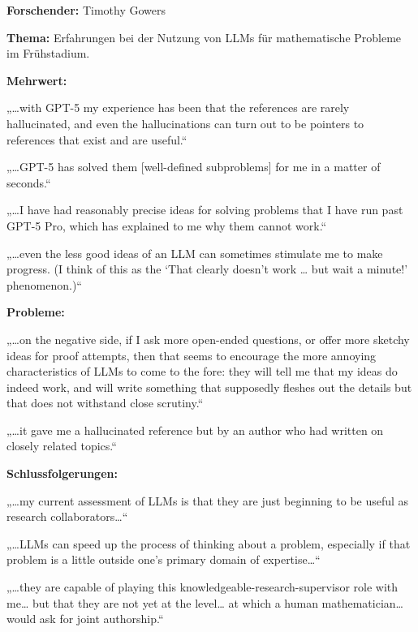 \documentclass[
  ngerman,
  letterpaper,
  DIV=11]{scrreprt}
\begin{document}
\begin{tcolorbox}[enhanced jigsaw, left=2mm, bottomrule=.15mm, arc=.35mm, rightrule=.15mm, colframe=quarto-callout-note-color-frame, coltitle=black, colback=white, toprule=.15mm, toptitle=1mm, colbacktitle=quarto-callout-note-color!10!white, title=\textcolor{quarto-callout-note-color}{\faInfo}\hspace{0.5em}{Mathematik / LLMs als Forschungspartner}, opacitybacktitle=0.6, leftrule=.75mm, bottomtitle=1mm, titlerule=0mm, opacityback=0, breakable]

\textbf{Forschender:} Timothy Gowers

\textbf{Thema:} Erfahrungen bei der Nutzung von LLMs für mathematische
Probleme im Frühstadium.

\textbf{Mehrwert:}

„\ldots with GPT-5 my experience has been that the references are rarely
hallucinated, and even the hallucinations can turn out to be pointers to
references that exist and are useful.``

„\ldots GPT-5 has solved them {[}well-defined subproblems{]} for me in a
matter of seconds.``

„\ldots I have had reasonably precise ideas for solving problems that I
have run past GPT-5 Pro, which has explained to me why them cannot
work.``

„\ldots even the less good ideas of an LLM can sometimes stimulate me to
make progress. (I think of this as the `That clearly doesn't work
\ldots{} but wait a minute!' phenomenon.)``

\textbf{Probleme:}

„\ldots on the negative side, if I ask more open-ended questions, or
offer more sketchy ideas for proof attempts, then that seems to
encourage the more annoying characteristics of LLMs to come to the fore:
they will tell me that my ideas do indeed work, and will write something
that supposedly fleshes out the details but that does not withstand
close scrutiny.``

„\ldots it gave me a hallucinated reference but by an author who had
written on closely related topics.``

\textbf{Schlussfolgerungen:}

„\ldots my current assessment of LLMs is that they are just beginning to
be useful as research collaborators\ldots``

„\ldots LLMs can speed up the process of thinking about a problem,
especially if that problem is a little outside one's primary domain of
expertise\ldots``

„\ldots they are capable of playing this
knowledgeable-research-supervisor role with me\ldots{} but that they are
not yet at the level\ldots{} at which a human mathematician\ldots{}
would ask for joint authorship.``

\end{tcolorbox}
\end{document}

